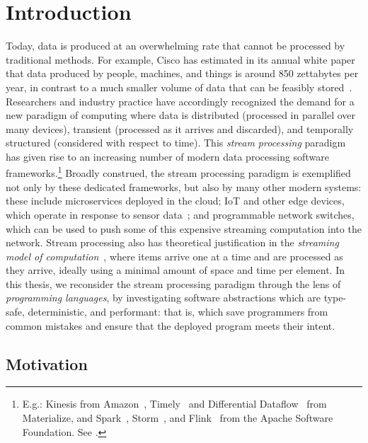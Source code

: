 \chapter{Introduction}
\label{cha:intro}

Today, data is produced at an overwhelming rate
that cannot be processed by traditional methods.
For example, Cisco has estimated in its annual white paper
that data produced by people, machines, and things
is around 850 zettabytes per year, in contrast to a much smaller volume
of data that can be feasibly stored~\cite{index2018forecast}.
Researchers and industry practice have accordingly recognized the demand
for a new paradigm of computing where data is
distributed (processed in parallel over many devices),
transient (processed as it arrives and discarded),
and temporally structured (considered with respect to time).
This \emph{stream processing} paradigm has given rise to an increasing number
of modern data processing software frameworks.\footnote{
  E.g.: Kinesis from Amazon~\cite{AmazonKinesis}, Timely~\cite{Timely} and Differential Dataflow~\cite{mcsherry2013differential} from Materialize, and Spark~\cite{SparkStreaming}, Storm~\cite{Storm}, and Flink~\cite{Flink} from the Apache Software Foundation.
  See .
}
Broadly construed, the stream processing paradigm is exemplified not only by these dedicated frameworks, but also by many other modern systems: these include microservices deployed in the cloud; IoT and other edge devices, which operate in response
to sensor data~\cite{shi2016edge, ashton2009internet}; and programmable network switches,
which can be used to push some of this expensive streaming computation
into the network.
Stream processing also has theoretical justification in the \emph{streaming model of computation}~\cite{M2005DS},
where items arrive one at a time and are processed as they arrive, ideally using
a minimal amount of space and time per element.
In this thesis, we reconsider the stream processing paradigm through the lens of \emph{programming languages}, by investigating software abstractions which are type-safe, deterministic, and performant: that is, which save programmers from common mistakes and ensure that the deployed program meets their intent.

\section{Motivation}

